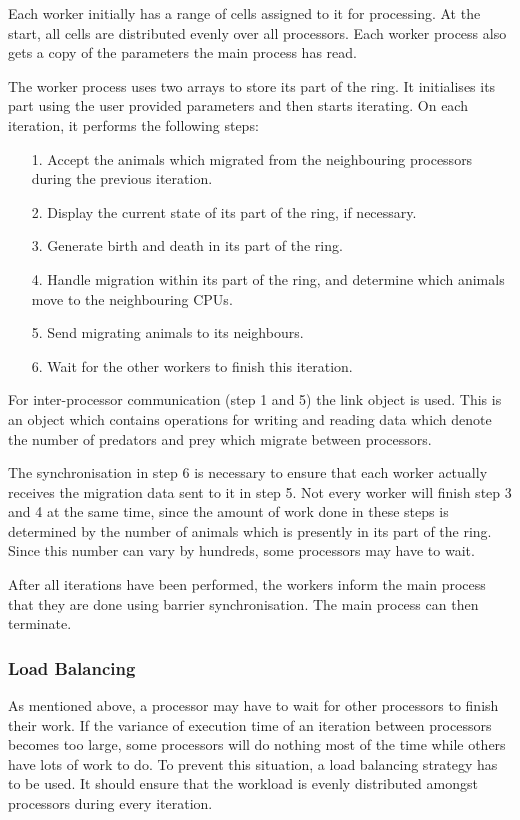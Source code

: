 Each worker initially has a range of cells assigned to it for
processing. At the start, all cells are distributed evenly over 
all processors.
Each worker process also gets a copy of the parameters
the main process has read.

The worker process uses two arrays to store its part of the ring.
It initialises its part using the user provided parameters and then
starts iterating. On each iteration, it performs the following
steps:
\begin{itemize}
	\item[1.] Accept the animals which migrated from the neighbouring
	processors during the previous iteration.
	\item[2.] Display the current state of its part of the ring,
	if necessary.
	\item[3.] Generate birth and death in its part of the ring.
	\item[4.] Handle migration within its part of the ring, and
	determine which animals move to the neighbouring CPUs.
	\item[5.] Send migrating animals to its neighbours.
	\item[6.] Wait for the other workers to finish this iteration.
\end{itemize}
For inter-processor communication (step 1 and 5) the link object is
used. This is an object which contains operations for writing and
reading data which denote the number of predators and prey which
migrate between processors.

The synchronisation in step 6 is necessary to ensure that each
worker actually receives the migration data sent to it in step 5. Not
every worker will finish step 3 and 4 at the same time, since the
amount of work done in these steps is determined by the number of
animals which is presently in its part of the ring. Since this number
can vary by hundreds, some processors may have to wait.

After all iterations have been performed, the workers inform the main
process that they are done using barrier synchronisation. The main
process can then terminate.

\subsubsection{Load Balancing}

As mentioned above, a processor may have to wait for other processors
to finish their work. If the variance of execution time of an iteration
between processors becomes too large, some processors will do nothing
most of the time while others have lots of work to do. To prevent this
situation, a load balancing strategy has to be used. It should ensure
that the workload is evenly distributed amongst processors during every
iteration.

